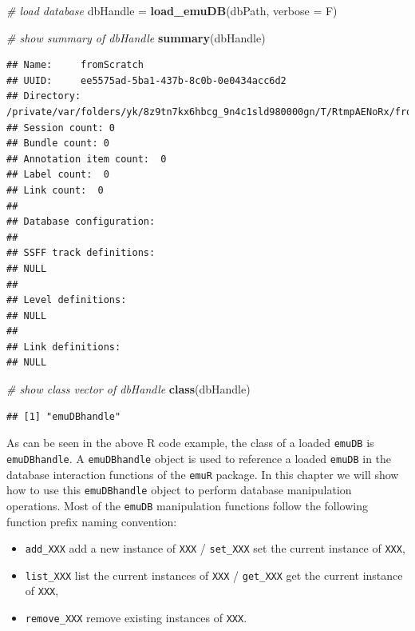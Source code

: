 \documentclass[]{book}
\newenvironment{Shaded}{\begin{snugshade}}{\end{snugshade}}
\newcommand{\CommentTok}[1]{\textcolor[rgb]{0.56,0.35,0.01}{\textit{#1}}}
\newcommand{\DataTypeTok}[1]{\textcolor[rgb]{0.13,0.29,0.53}{#1}}
\newcommand{\KeywordTok}[1]{\textcolor[rgb]{0.13,0.29,0.53}{\textbf{#1}}}
\newcommand{\NormalTok}[1]{#1}
\newcommand{\StringTok}[1]{\textcolor[rgb]{0.31,0.60,0.02}{#1}}
\providecommand{\tightlist}{%
  \setlength{\itemsep}{0pt}\setlength{\parskip}{0pt}}
\begin{document}
\begin{Shaded}
\begin{Highlighting}[]
\CommentTok{# load database}
\NormalTok{dbHandle =}\StringTok{ }\KeywordTok{load_emuDB}\NormalTok{(dbPath, }\DataTypeTok{verbose =}\NormalTok{ F)}

\CommentTok{# show summary of dbHandle}
\KeywordTok{summary}\NormalTok{(dbHandle)}
\end{Highlighting}
\end{Shaded}

\begin{verbatim}
## Name:     fromScratch 
## UUID:     ee5575ad-5ba1-437b-8c0b-0e0434acc6d2 
## Directory:    /private/var/folders/yk/8z9tn7kx6hbcg_9n4c1sld980000gn/T/RtmpAENoRx/fromScratch_emuDB 
## Session count: 0 
## Bundle count: 0 
## Annotation item count:  0 
## Label count:  0 
## Link count:  0 
## 
## Database configuration:
## 
## SSFF track definitions:
## NULL
## 
## Level definitions:
## NULL
## 
## Link definitions:
## NULL
\end{verbatim}

\begin{Shaded}
\begin{Highlighting}[]
\CommentTok{# show class vector of dbHandle}
\KeywordTok{class}\NormalTok{(dbHandle)}
\end{Highlighting}
\end{Shaded}

\begin{verbatim}
## [1] "emuDBhandle"
\end{verbatim}

As can be seen in the above R code example, the class of a loaded \texttt{emuDB} is \texttt{emuDBhandle}. A \texttt{emuDBhandle} object is used to reference a loaded \texttt{emuDB} in the database interaction functions of the \texttt{emuR} package. In this chapter we will show how to use this \texttt{emuDBhandle} object to perform database manipulation operations. Most of the \texttt{emuDB} manipulation functions follow the following function prefix naming convention:

\begin{itemize}
\tightlist
\item
  \texttt{add\_XXX} add a new instance of \texttt{XXX} / \texttt{set\_XXX} set the current instance of \texttt{XXX},
\item
  \texttt{list\_XXX} list the current instances of \texttt{XXX} / \texttt{get\_XXX} get the current instance of \texttt{XXX},
\item
  \texttt{remove\_XXX} remove existing instances of \texttt{XXX}.
\end{itemize}
\end{document}
